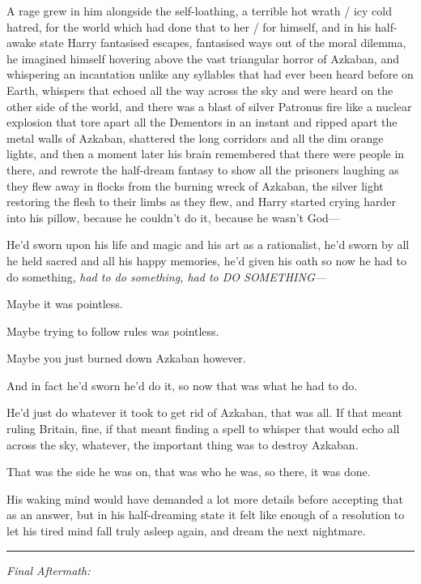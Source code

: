 A rage grew in him alongside the self-loathing, a terrible hot wrath /
icy cold hatred, for the world which had done that to her / for himself,
and in his half-awake state Harry fantasised escapes, fantasised ways
out of the moral dilemma, he imagined himself hovering above the vast
triangular horror of Azkaban, and whispering an incantation unlike any
syllables that had ever been heard before on Earth, whispers that echoed
all the way across the sky and were heard on the other side of the
world, and there was a blast of silver Patronus fire like a nuclear
explosion that tore apart all the Dementors in an instant and ripped
apart the metal walls of Azkaban, shattered the long corridors and all
the dim orange lights, and then a moment later his brain remembered that
there were people in there, and rewrote the half-dream fantasy to show
all the prisoners laughing as they flew away in flocks from the burning
wreck of Azkaban, the silver light restoring the flesh to their limbs as
they flew, and Harry started crying harder into his pillow, because he
couldn't do it, because he wasn't God---

He'd sworn upon his life and magic and his art as a rationalist, he'd
sworn by all he held sacred and all his happy memories, he'd given his
oath so now he had to do something, \emph{had to do something, had to DO
SOMETHING---}

Maybe it was pointless.

Maybe trying to follow rules was pointless.

Maybe you just burned down Azkaban however.

And in fact he'd sworn he'd do it, so now that was what he had to do.

He'd just do whatever it took to get rid of Azkaban, that was all. If
that meant ruling Britain, fine, if that meant finding a spell to
whisper that would echo all across the sky, whatever, the important
thing was to destroy Azkaban.

That was the side he was on, that was who he was, so there, it was done.

His waking mind would have demanded a lot more details before accepting
that as an answer, but in his half-dreaming state it felt like enough of
a resolution to let his tired mind fall truly asleep again, and dream
the next nightmare.

\begin{center}\rule{3in}{0.4pt}\end{center}

\emph{Final Aftermath:}

